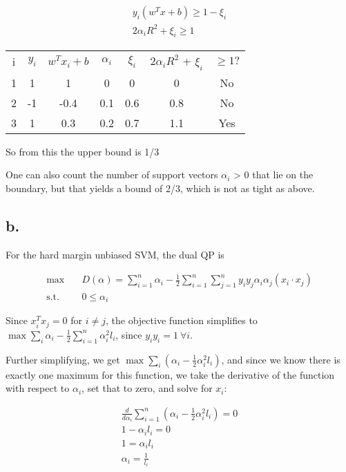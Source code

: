 \documentclass[]{article}
\begin{document}
\begin{align*}
y_i\left(w^T x + b\right) \geq 1 - \xi_i \\
2\alpha_i R^2 + \xi_i \geq 1
\end{align*}
\begin{tabular}{|c|c|c|c|c|c|c|}
\hline
i & $y_i$ & $w^T x_i + b$ & $\alpha_i$ & $\xi_i$ & $2\alpha_i R^2$ + $\xi_i$  & $\geq 1?$ \\
1 & 1 & 1 & 0 & 0 & 0 & No\\
2 & -1 & -0.4 & 0.1 & 0.6 & 0.8 & No\\
3 & 1 & 0.3 & 0.2 & 0.7 & 1.1 & Yes\\
\hline
\end{tabular}

So from this the upper bound is 1/3

One can also count the number of support vectors $\alpha_i$ > 0 that lie on the boundary, but that yields a bound of 2/3, which is not as tight as above.


\subsection{b.}
For the hard margin unbiased SVM, the dual QP is

\begin{align*}
\max\quad & D(\alpha) = \sum_{i=1}^n \alpha_i - \frac{1}{2} \sum_{i=1}^n \sum_{j=1}^n y_iy_j\alpha_i\alpha_j(x_i \cdot x_j)\\
\text{s.t.}\quad & 0 \le \alpha_i
\end{align*}

Since $x_i^Tx_j = 0$ for $i \neq j$, the objective function simplifies to $\max \sum_i \alpha_i - \frac{1}{2}\sum_{i=1}^n \alpha_i^2 l_i$, since $y_iy_i = 1~\forall i$.

Further simplifying, we get $\max \sum_i \left( \alpha_i - \frac{1}{2}\alpha_i^{2} l_i\right)$, and since we know there is exactly one maximum for
this function, we take the derivative of the function with respect to $\alpha_i$, set that to zero, and solve for $x_i$:

\begin{align*}
\frac{d}{d\alpha_i} \sum_{i=1}^n\left(\alpha_i - \frac{1}{2}\alpha_i^{2} l_i\right) = 0 \\
1 - \alpha_i l_i = 0 \\
1 = \alpha_i l_i \\
\alpha_i = \frac{1}{l_i} 
\end{align*}
\end{document}
